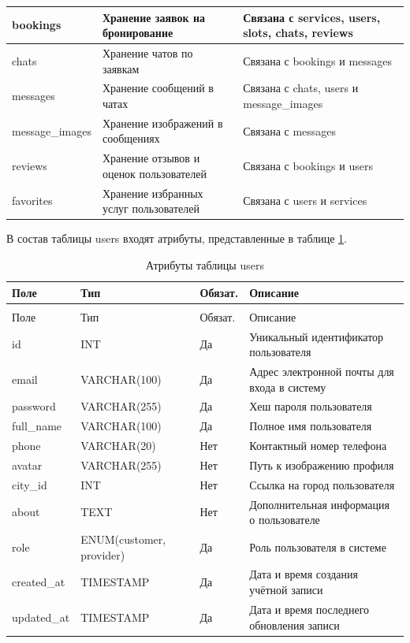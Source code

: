 \begin{longtable}{|>{\raggedright\arraybackslash}p{3.9cm}|>{\raggedright\arraybackslash}p{4.5cm}|>{\raggedright\arraybackslash}p{5.9cm}|}
	bookings & Хранение заявок на бронирование & Связана с services, users, slots, chats, reviews \\ \hline
	chats & Хранение чатов по заявкам & Связана с bookings и messages \\ \hline
	messages & Хранение сообщений в чатах & Связана с chats, users и message\_images \\ \hline
	message\_images & Хранение изображений в сообщениях & Связана с messages \\ \hline
	reviews & Хранение отзывов и оценок пользователей & Связана с bookings и users \\ \hline
	favorites & Хранение избранных услуг пользователей & Связана с users и services \\ \hline
\end{longtable}

В состав таблицы users входят атрибуты, представленные в таблице \ref{users:table}.

\begin{longtable}{|>{\raggedright\arraybackslash}p{3.8cm}|>{\raggedright\arraybackslash}p{3.8cm}|>{\centering\arraybackslash}p{2.0cm}|>{\raggedright\arraybackslash}p{5.4cm}|}
	\caption{Атрибуты таблицы users}\label{users:table} \\ \hline
	\centering Поле & \centering Тип & \centering Обязат. & \centering\arraybackslash Описание \\ \hline
	\endfirsthead
	\multicolumn{4}{l}{Продолжение таблицы \ref{users:table}} \\ \hline
	\centering Поле & \centering Тип & \centering Обязат. & \centering\arraybackslash Описание \\ \hline
	\endhead
	id & INT & Да & Уникальный идентификатор пользователя \\ \hline
	email & VARCHAR(100) & Да & Адрес электронной почты для входа в систему \\ \hline
	password & VARCHAR(255) & Да & Хеш пароля пользователя \\ \hline
	full\_name & VARCHAR(100) & Да & Полное имя пользователя \\ \hline
	phone & VARCHAR(20) & Нет & Контактный номер телефона \\ \hline
	avatar & VARCHAR(255) & Нет & Путь к изображению профиля \\ \hline
	city\_id & INT & Нет & Ссылка на город пользователя \\ \hline
	about & TEXT & Нет & Дополнительная информация о пользователе \\ \hline
	role & ENUM(customer, provider) & Да & Роль пользователя в системе \\ \hline
	created\_at & TIMESTAMP & Да & Дата и время создания учётной записи \\ \hline
	updated\_at & TIMESTAMP & Да & Дата и время последнего обновления записи \\ \hline
\end{longtable}

